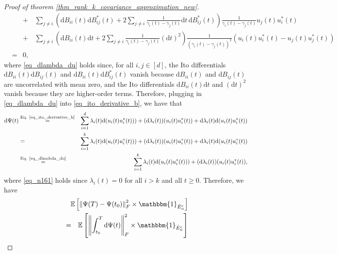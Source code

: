 \documentclass[11pt,letterpaper]{article}
\begin{document}
\begin{proof}[Proof of theorem \ref{thm_rank_k_covariance_approximation_new}]
\begin{eqnarray}
%
& & + \quad \sum_{j \neq i} \left(\mathrm{d}B_{i i}(t)\mathrm{d}B_{ij}^\ast(t) +  2 \sum_{j \neq i} \frac{1}{\gamma_i(t) - \gamma_j(t)} \mathrm{d}t \, \mathrm{d}B_{ij}^\ast(t) \right)\frac{1}{\gamma_i(t) - \gamma_j(t)} u_j(t) u_i^\ast(t)\nonumber\\
%
& & + \quad  \sum_{j \neq i} \left(\mathrm{d}B_{i i}(t) \mathrm{d}t +  2 \sum_{j \neq i} \frac{1}{\gamma_i(t) - \gamma_j(t)} (\mathrm{d}t)^2\right) \frac{1}{(\gamma_i(t)- \gamma_j(t))^2} (u_i(t) u_i^\ast(t) - u_j(t)u_j^\ast(t))\nonumber\\
%
& =  & 0 \label{eq_dlambda_du},
\end{eqnarray}
%
%
%
 where \eqref{eq_dlambda_du} holds since, for all $i,j \in [d]$, the Ito differentials $\mathrm{d}B_{i i}(t)\mathrm{d}B_{ij}(t)$ and $\mathrm{d}B_{i i}(t)\mathrm{d}B_{ij}^\ast(t)$ vanish because $\mathrm{d}B_{i i}(t)$ and $\mathrm{d}B_{ij}(t)$ are uncorrelated with mean zero, and the Ito differentials $\mathrm{d}B_{i i}(t) \mathrm{d}t$ and $(\mathrm{d}t)^2$ vanish because they are higher-order terms.
% 
Therefore, plugging in \eqref{eq_dlambda_du} into \eqref{eq_ito_derivative_b}, we have that
%
\begin{eqnarray}
    \mathrm{d} \Psi(t)  &\stackrel{\textrm{Eq. \eqref{eq_ito_derivative_b}}}{=}& \sum_{i=1}^d \lambda_i(t) \mathrm{d}(u_i(t) u_i^\ast(t))) + (\mathrm{d}\lambda_i(t)) (u_i(t) u_i^\ast(t)) + \mathrm{d}\lambda_i(t) \mathrm{d}( u_i(t) u_i^\ast(t)) \nonumber\\
    &=&\sum_{i=1}^k \lambda_i(t) \mathrm{d}(u_i(t) u_i^\ast(t))) + (\mathrm{d}\lambda_i(t)) (u_i(t) u_i^\ast(t)) + \mathrm{d}\lambda_i(t) \mathrm{d}( u_i(t) u_i^\ast(t)) \label{eq_n161}\\
     &\stackrel{\textrm{Eq. \eqref{eq_dlambda_du}}}{=}&\sum_{i=1}^k \lambda_i(t) \mathrm{d}(u_i(t) u_i^\ast(t))) + (\mathrm{d}\lambda_i(t)) (u_i(t) u_i^\ast(t)), \label{eq_ito_derivative}
\end{eqnarray}
%
where \eqref{eq_n161} holds since  $\lambda_i(t) = 0$ for all $i >k$ and all $t\geq 0$.
%
Therefore, we have 
\newpage
%
\begin{eqnarray}  \label{eq_ito_integral_1}
& &\!\!\!\!\!\!\!\!\!\!\!\!\!\!\! \! \!\!\!\!\!\!\! \! \!\! \! \!\!\!\!\!\!\!\!\!\!\!\!\!\!\!\! \! \!\! \! \!\!\!\!\!\!\!\!\!\!\!\!\!\!\!\! \! \!\mathbb{E}\left[\left\|\Psi (T) -  \Psi(t_0)\right \|_F^2 \times \mathbbm{1}_{\hat{E}_\alpha^c} \right] \nonumber\\
%
&=&\mathbb{E}\left[\left\|\int_{t_0}^T \mathrm{d}\Psi(t)\right \|_F^2 \times \mathbbm{1}_{\hat{E}_\alpha^c} \right] \nonumber\\

\end{eqnarray}
\end{proof}
\end{document}
